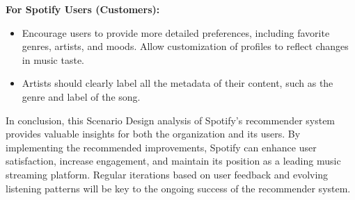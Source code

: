 \documentclass[
]{article}
\begin{document}
\textbf{For Spotify Users (Customers):}

\begin{itemize}
\item
  Encourage users to provide more detailed preferences, including
  favorite genres, artists, and moods. Allow customization of profiles
  to reflect changes in music taste.
\item
  Artists should clearly label all the metadata of their content, such
  as the genre and label of the song.
\end{itemize}

In conclusion, this Scenario Design analysis of Spotify's recommender
system provides valuable insights for both the organization and its
users. By implementing the recommended improvements, Spotify can enhance
user satisfaction, increase engagement, and maintain its position as a
leading music streaming platform. Regular iterations based on user
feedback and evolving listening patterns will be key to the ongoing
success of the recommender system.
\end{document}
